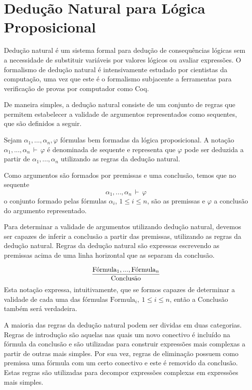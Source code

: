 \section{Dedu\c{c}\~ao Natural para L\'ogica Proposicional}\label{deducao-natural-proposicional}

Dedu\c{c}\~ao natural \'e um sistema formal para
dedu\c{c}\~ao de consequ\^encias l\'ogicas sem a necessidade de
substituir vari\'aveis por valores l\'ogicos ou avaliar express\~oes.
O formalismo de dedu\c{c}\~ao natural \'e intensivamente estudado por
cientistas da computa\c{c}\~ao, uma vez que este \'e o formalismo
subjacente a ferramentas para verifica\c{c}\~ao de provas por
computador como Coq.

De maneira simples, a dedu\c{c}\~ao natural consiste de um conjunto de
regras que permitem estabelecer a validade de argumentos representados
como sequentes, que s\~ao definidos a seguir.

\begin{Definition}[Sequente]
Sejam $\alpha_1,...,\alpha_n,\varphi$ f\'ormulas bem formadas da
l\'ogica proposicional. A nota\c{c}\~ao
$\alpha_1,...,\alpha_n\,\vdash\,\varphi$ \'e denominada de sequente e
representa que $\varphi$ pode ser deduzida a partir de
$\alpha_1,...,\alpha_n$ utilizando as regras da dedu\c{c}\~ao natural.
\end{Definition}

Como argumentos s\~ao formados por premissas e uma conclus\~ao, temos
que no sequente
\[\alpha_1,...,\alpha_n\,\vdash\,\varphi\]
o conjunto formado pelas f\'ormulas $\alpha_i$, $1\leq i \leq n$,
s\~ao as premissas e
$\varphi$ a conclus\~ao do argumento representado.

Para determinar a validade de argumentos utilizando dedu\c{c}\~ao
natural, devemos ser capazes de inferir a conclus\~ao a partir das
premissas, utilizando as regras da dedu\c{c}\~ao natural. Regras da
dedu\c{c}\~ao natural s\~ao expressas escrevendo as premissas acima de
uma linha horizontal que as separam da conclus\~ao.

\[
      \infer
           {\text{Conclus\~ao}}
          {\text{F\'ormula}_1,...,\text{F\'ormula}_n}
\]
Esta nota\c{c}\~ao expressa, intuitivamente, que se formos capazes de
determinar a validade de cada uma das f\'ormulas $\text{Formula}_i,\:
1\leq i \leq n$, ent\~ao a Conclus\~ao tamb\'em ser\'a verdadeira.

A maioria das regras da dedu\c{c}\~ao natural podem ser dividas em duas categorias.
Regras de introdu\c{c}\~ao s\~ao aquelas nas quais um novo conectivo
\'e inclu\'ido na f\'ormula da conclus\~ao e s\~ao utilizadas para
construir express\~oes mais complexas a partir de outras mais simples.
Por sua vez, regras de elimina\c{c}\~ao possuem como premissa uma
f\'ormula com um certo conectivo e este \'e removido da
conclus\~ao. Estas regras s\~ao utilizadas para decompor express\~oes
complexas em express\~oes mais simples.

